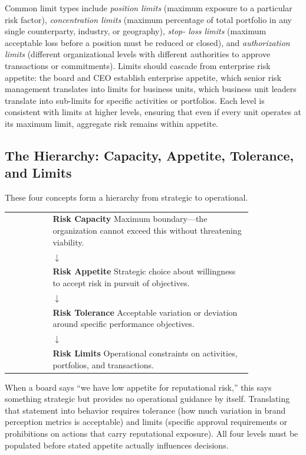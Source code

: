 \documentclass[11pt,openany]{book}
\begin{document}
Common limit types include \emph{position limits} (maximum exposure to a
particular risk factor), \emph{concentration limits} (maximum percentage of
total portfolio in any single counterparty, industry, or geography), \emph{stop-
loss limits} (maximum acceptable loss before a position must be reduced or
closed), and \emph{authorization limits} (different organizational levels with
different authorities to approve transactions or commitments). Limits should
cascade from enterprise risk appetite: the board and CEO establish enterprise
appetite, which senior risk management translates into limits for business units,
which business unit leaders translate into sub-limits for specific activities or
portfolios. Each level is consistent with limits at higher levels, ensuring that
even if every unit operates at its maximum limit, aggregate risk remains within
appetite.

\subsection{The Hierarchy: Capacity, Appetite, Tolerance, and Limits}
\label{subsec:hierarchy}

These four concepts form a hierarchy from strategic to operational.

\begin{managerialinsight}

\begin{center}
\begin{tabular}{c p{0.82\linewidth}}
 & \textbf{Risk Capacity}\quad
   {\small\color{ERMMidGray}Maximum boundary---the organization cannot exceed
   this without threatening viability.}\\[6pt]
 & \quad$\downarrow$\\[4pt]
 & \textbf{Risk Appetite}\quad
   {\small\color{ERMMidGray}Strategic choice about willingness to accept
   risk in pursuit of objectives.}\\[6pt]
 & \quad$\downarrow$\\[4pt]
 & \textbf{Risk Tolerance}\quad
   {\small\color{ERMMidGray}Acceptable variation or deviation around specific
   performance objectives.}\\[6pt]
 & \quad$\downarrow$\\[4pt]
 & \textbf{Risk Limits}\quad
   {\small\color{ERMMidGray}Operational constraints on activities, portfolios,
   and transactions.}\\
\end{tabular}
\end{center}

\medskip
When a board says ``we have low appetite for reputational risk,'' this says
something strategic but provides no operational guidance by itself. Translating
that statement into behavior requires tolerance (how much variation in brand
perception metrics is acceptable) and limits (specific approval requirements or
prohibitions on actions that carry reputational exposure). All four levels must
be populated before stated appetite actually influences decisions.

\end{managerialinsight}
\end{document}
